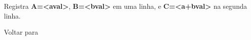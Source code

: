 \documentclass[letterpaper,10pt,brazil]{sphinxmanual}
\begin{document}
\begin{DUlineblock}{0em}
\item[] 
\item[]
\begin{DUlineblock}{\DUlineblockindent}
\item[] 
\item[] 
\end{DUlineblock}
\item[] Registra \textbf{A=\textless{}aval\textgreater{}}, \textbf{B=\textless{}bval\textgreater{}} em uma linha, e \textbf{C=\textless{}a+bval\textgreater{}} na segunda linha.
\item[] 
\item[] Voltar para {\hyperref[debugger/general:debugger\string-general\string-list]{}}
\end{DUlineblock}
\begin{quote}
\label{debugger/general:debugger-command-tracelog}\end{quote}
\end{document}
